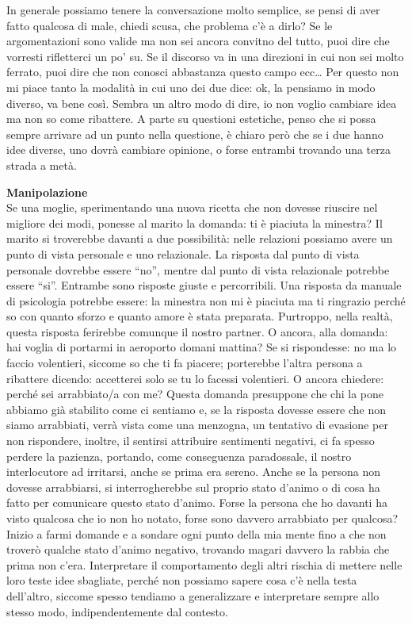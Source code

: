 \documentclass[12pt]{book} %
\begin{document}
In generale possiamo tenere la conversazione molto semplice, se pensi di aver fatto qualcosa di male, chiedi scusa, che problema c'è a dirlo? Se le argomentazioni sono valide ma non sei ancora convitno del tutto, puoi dire che vorresti rifletterci un po' su. Se il discorso va in una direzioni in cui non sei molto ferrato, puoi dire che non conosci abbastanza questo campo ecc…
Per questo non mi piace tanto la modalità in cui uno dei due dice: ok, la pensiamo in modo diverso, va bene così. Sembra un altro modo di dire, io non voglio cambiare idea ma non so come ribattere. A parte su questioni estetiche, penso che si possa sempre arrivare ad un punto nella questione, è chiaro però che se i due hanno idee diverse, uno dovrà cambiare opinione, o forse entrambi trovando una terza strada a metà.

\noindent \textbf{\large Manipolazione} \\
Se una moglie, sperimentando una nuova ricetta che non dovesse riuscire nel migliore dei modi,
ponesse al marito la domanda: ti è piaciuta la minestra? Il marito si troverebbe davanti a due possibilità: nelle
relazioni possiamo avere un punto di vista personale e uno relazionale. La risposta dal punto di vista personale
dovrebbe essere “no”, mentre dal punto di vista relazionale potrebbe essere “si”. Entrambe sono risposte giuste e
percorribili. Una risposta da manuale di psicologia potrebbe essere: la minestra non mi è piaciuta ma ti ringrazio
perché so con quanto sforzo e quanto amore è stata preparata. Purtroppo, nella realtà, questa risposta ferirebbe
comunque il nostro partner. O ancora, alla domanda: hai voglia di portarmi in aeroporto domani mattina? Se si
rispondesse: no ma lo faccio volentieri, siccome so che ti fa piacere; porterebbe l'altra persona a ribattere dicendo:
accetterei solo se tu lo facessi volentieri. O ancora chiedere: perché sei arrabbiato/a con me? Questa domanda
presuppone che chi la pone abbiamo già stabilito come ci sentiamo e, se la risposta dovesse essere che non siamo
arrabbiati, verrà vista come una menzogna, un tentativo di evasione per non rispondere, inoltre, il sentirsi attribuire
sentimenti negativi, ci fa spesso perdere la pazienza, portando, come conseguenza paradossale, il nostro
interlocutore ad irritarsi, anche se prima era sereno. Anche se la persona non dovesse arrabbiarsi, si interrogherebbe
sul proprio stato d'animo o di cosa ha fatto per comunicare questo stato d'animo. 
Forse la persona che ho davanti ha visto qualcosa che io non ho notato,
forse sono davvero arrabbiato per qualcosa? Inizio a farmi domande e a sondare ogni punto della mia mente fino a che
non troverò qualche stato d'animo negativo, trovando magari davvero la rabbia che prima non
c'era. Interpretare il comportamento degli altri rischia di mettere nelle loro teste idee
sbagliate, perché non possiamo sapere cosa c'è nella testa dell'altro, siccome spesso tendiamo a generalizzare e
interpretare sempre allo stesso modo, indipendentemente dal contesto. 
\end{document}
